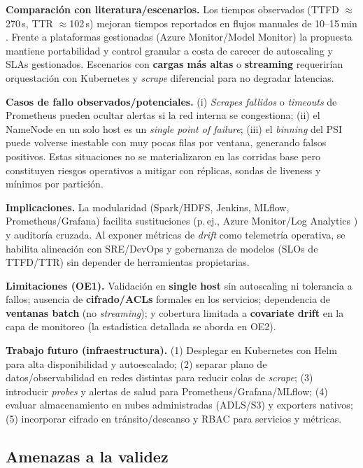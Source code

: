 \textbf{Comparación con literatura/escenarios.} Los tiempos observados (TTFD $\approx$270\,s, TTR $\approx$102\,s) mejoran tiempos reportados en flujos manuales de 10–15\,min \citep{Amershi2019,Chatterjee2023}. Frente a plataformas gestionadas (Azure Monitor/Model Monitor) la propuesta mantiene portabilidad y control granular a costa de carecer de autoscaling y SLAs gestionados. Escenarios con \textbf{cargas más altas} o \textbf{streaming} requerirían orquestación con Kubernetes y \textit{scrape} diferencial para no degradar latencias.

\textbf{Casos de fallo observados/potenciales.} (i) \textit{Scrapes fallidos} o \textit{timeouts} de Prometheus pueden ocultar alertas si la red interna se congestiona; (ii) el NameNode en un solo host es un \textit{single point of failure}; (iii) el \textit{binning} del PSI puede volverse inestable con muy pocas filas por ventana, generando falsos positivos. Estas situaciones no se materializaron en las corridas base pero constituyen riesgos operativos a mitigar con réplicas, sondas de liveness y mínimos por partición.

\textbf{Implicaciones.} La modularidad (Spark/HDFS, Jenkins, MLflow, Prometheus/Grafana) facilita sustituciones (p.\,ej., Azure Monitor/Log Analytics \citep{Bhatt2025,AzureMonitor2022}) y auditoría cruzada. Al exponer métricas de \textit{drift} como telemetría operativa, se habilita alineación con SRE/DevOps y gobernanza de modelos (SLOs de TTFD/TTR) sin depender de herramientas propietarias.

\textbf{Limitaciones (OE1).} Validación en \textbf{single host} sin autoscaling ni tolerancia a fallos; ausencia de \textbf{cifrado/ACLs} formales en los servicios; dependencia de \textbf{ventanas batch} (no \textit{streaming}); y cobertura limitada a \textbf{covariate drift} en la capa de monitoreo (la estadística detallada se aborda en OE2).

\textbf{Trabajo futuro (infraestructura).} (1) Desplegar en Kubernetes con Helm para alta disponibilidad y autoescalado; (2) separar plano de datos/observabilidad en redes distintas para reducir colas de \textit{scrape}; (3) introducir \textit{probes} y alertas de salud para Prometheus/Grafana/MLflow; (4) evaluar almacenamiento en nubes administradas (ADLS/S3) y exporters nativos; (5) incorporar cifrado en tránsito/descanso y RBAC para servicios y métricas.

\subsection{Amenazas a la validez}

